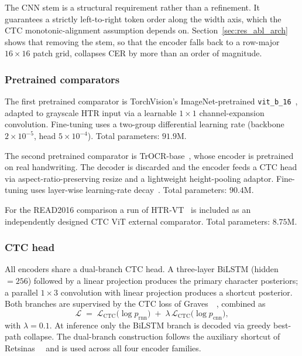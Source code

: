 The CNN stem is a structural requirement rather than a refinement. It guarantees a strictly left-to-right token order along the width axis, which the CTC monotonic-alignment assumption depends on. Section~\ref{sec:res_abl_arch} shows that removing the stem, so that the encoder falls back to a row-major $16 \times 16$ patch grid, collapses CER by more than an order of magnitude.

\subsubsection{Pretrained comparators}

The first pretrained comparator is TorchVision's ImageNet-pretrained \texttt{vit\_b\_16}~\cite{dosovitskiy2021vit}, adapted to grayscale HTR input via a learnable $1{\times}1$ channel-expansion convolution. Fine-tuning uses a two-group differential learning rate (backbone $2 \times 10^{-5}$, head $5 \times 10^{-4}$). Total parameters: $91.9$M.

The second pretrained comparator is TrOCR-base~\cite{li2023trocr}, whose encoder is pretrained on real handwriting. The decoder is discarded and the encoder feeds a CTC head via aspect-ratio-preserving resize and a lightweight height-pooling adaptor. Fine-tuning uses layer-wise learning-rate decay~\cite{howard2018ulmfit}. Total parameters: $90.4$M.

For the READ2016 comparison a run of HTR-VT~\cite{li2024htrvt} is included as an independently designed CTC ViT external comparator. Total parameters: $8.75$M.

\subsubsection{CTC head}
\label{sec:heads}

All encoders share a dual-branch CTC head. A three-layer BiLSTM (hidden $= 256$) followed by a linear projection produces the primary character posteriors; a parallel $1{\times}3$ convolution with linear projection produces a shortcut posterior. Both branches are supervised by the CTC loss of Graves~\etal~\cite{graves2006ctc}, combined as
\begin{equation}
\label{eq:ctc_loss}
\mathcal{L} \;=\; \mathcal{L}_{\mathrm{CTC}}\!\bigl(\log p_{\mathrm{rnn}}\bigr) \;+\; \lambda \, \mathcal{L}_{\mathrm{CTC}}\!\bigl(\log p_{\mathrm{cnn}}\bigr),
\end{equation}
with $\lambda = 0.1$. At inference only the BiLSTM branch is decoded via greedy best-path collapse. The dual-branch construction follows the auxiliary shortcut of Retsinas~\etal~\cite{retsinas2024htrbestpractices} and is used across all four encoder families.

